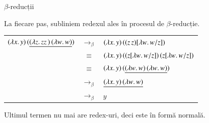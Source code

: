 \documentclass[xcolor=pdftex,romanian,colorlinks]{beamer}
\begin{document}
\begin{frame}[fragile]{$\beta$-reducții}

La fiecare pas, subliniem redexul ales în procesul de $\beta$-reducție.

\begin{center}
\begin{tabular}{rcl}
$(\lambda x.\,y)\, (\underline{(\lambda z.\,zz\, )\, (\lambda w.\,w)})$ & $\rightarrow_\beta$ & $(\lambda x.\,y)\, ( (z\, z)[\lambda w.\,w/z] )$ \\ 
& $\equiv$ & $(\lambda x.\,y)\, ( (z[\lambda w.\,w/z])\, (z[\lambda w.\,w/z] )$ \\
& $\equiv$ & $(\lambda x.\,y)\, (\underline{(\lambda w.\,w)\, (\lambda w.\,w)})$ \\
& $\rightarrow_\beta$ & $\underline{(\lambda x.\,y)\, (\lambda w.\,w)}$ \\
& $\rightarrow_\beta$ & $y$ \\
\end{tabular}
\end{center}

Ultimul termen nu mai are redex-uri, deci este în formă normală.

\end{frame}
\end{document}
